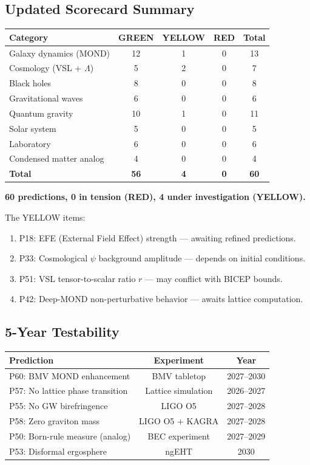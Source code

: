 \documentclass[11pt,a4paper]{article}
\newcommand{\GREEN}{\textcolor{dfdgreen}{\textbf{GREEN}}}
\newcommand{\YELLOW}{\textcolor{dfdyellow}{\textbf{YELLOW}}}
\newcommand{\RED}{\textcolor{dfdred}{\textbf{RED}}}
\begin{document}
\subsection{Updated Scorecard Summary}

\begin{center}
\begin{tabular}{lcccc}
\toprule
\textbf{Category} & \GREEN & \YELLOW & \RED & \textbf{Total} \\
\midrule
Galaxy dynamics (MOND) & 12 & 1 & 0 & 13 \\
Cosmology (VSL + $\Lambda$) & 5 & 2 & 0 & 7 \\
Black holes & 8 & 0 & 0 & 8 \\
Gravitational waves & 6 & 0 & 0 & 6 \\
Quantum gravity & 10 & 1 & 0 & 11 \\
Solar system & 5 & 0 & 0 & 5 \\
Laboratory & 6 & 0 & 0 & 6 \\
Condensed matter analog & 4 & 0 & 0 & 4 \\
\midrule
\textbf{Total} & \textbf{56} & \textbf{4} & \textbf{0} & \textbf{60} \\
\bottomrule
\end{tabular}
\end{center}

\textbf{60 predictions, 0 in tension (RED), 4 under investigation (YELLOW).}

The YELLOW items:
\begin{enumerate}
\item P18: EFE (External Field Effect) strength --- awaiting refined predictions.
\item P33: Cosmological $\psi$ background amplitude --- depends on initial conditions.
\item P51: VSL tensor-to-scalar ratio $r$ --- may conflict with BICEP bounds.
\item P42: Deep-MOND non-perturbative behavior --- awaits lattice computation.
\end{enumerate}

\subsection{5-Year Testability}

\begin{center}
\begin{tabular}{lcc}
\toprule
\textbf{Prediction} & \textbf{Experiment} & \textbf{Year} \\
\midrule
P60: BMV MOND enhancement & BMV tabletop & 2027--2030 \\
P57: No lattice phase transition & Lattice simulation & 2026--2027 \\
P55: No GW birefringence & LIGO O5 & 2027--2028 \\
P58: Zero graviton mass & LIGO O5 + KAGRA & 2027--2028 \\
P50: Born-rule measure (analog) & BEC experiment & 2027--2029 \\
P53: Disformal ergosphere & ngEHT & 2030 \\
\bottomrule
\end{tabular}
\end{center}
\end{document}
